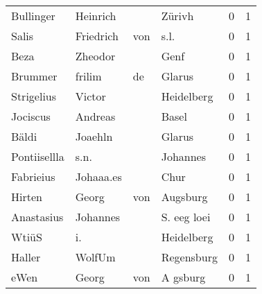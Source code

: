 \begin{tabular}{llllrr}
                Bullinger &                           Heinrich &             &                                      Zürivh &          0 &         1 \\
                    Salis &                          Friedrich &         von &                                        s.l. &          0 &         1 \\
                     Beza &                            Zheodor &             &                                        Genf &          0 &         1 \\
                  Brummer &                             frilim &          de &                                      Glarus &          0 &         1 \\
               Strigelius &                             Victor &             &                                  Heidelberg &          0 &         1 \\
                 Jociscus &                            Andreas &             &                                       Basel &          0 &         1 \\
                    Bäldi &                            Joaehln &             &                                      Glarus &          0 &         1 \\
             Pontiisellla &                               s.n. &             &                                    Johannes &          0 &         1 \\
                Fabrieius &                          Johaaa.es &             &                                        Chur &          0 &         1 \\
                   Hirten &                              Georg &         von &                                    Augsburg &          0 &         1 \\
               Anastasius &                           Johannes &             &                                 S. eeg loei &          0 &         1 \\
                    WtiüS &                                 i. &             &                                  Heidelberg &          0 &         1 \\
                   Haller &                             WolfUm &             &                                  Regensburg &          0 &         1 \\
                     eWen &                              Georg &         von &                                    A gsburg &          0 &         1 \\

\end{tabular}
